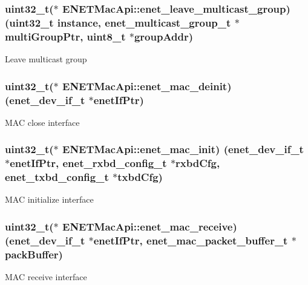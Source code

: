 \subsubsection[{\texorpdfstring{enet\+\_\+leave\+\_\+multicast\+\_\+group}{enet_leave_multicast_group}}]{\setlength{\rightskip}{0pt plus 5cm}uint32\+\_\+t($\ast$  E\+N\+E\+T\+Mac\+Api\+::enet\+\_\+leave\+\_\+multicast\+\_\+group) (uint32\+\_\+t instance, {\bf enet\+\_\+multicast\+\_\+group\+\_\+t} $\ast$multi\+Group\+Ptr, uint8\+\_\+t $\ast$group\+Addr)}\hypertarget{structENETMacApi_a3f14ecb5e7c1ba8244d6f6f7c6569d02}{}\label{structENETMacApi_a3f14ecb5e7c1ba8244d6f6f7c6569d02}
Leave multicast group 
\subsubsection[{\texorpdfstring{enet\+\_\+mac\+\_\+deinit}{enet_mac_deinit}}]{\setlength{\rightskip}{0pt plus 5cm}uint32\+\_\+t($\ast$  E\+N\+E\+T\+Mac\+Api\+::enet\+\_\+mac\+\_\+deinit) ({\bf enet\+\_\+dev\+\_\+if\+\_\+t} $\ast$enet\+If\+Ptr)}\hypertarget{structENETMacApi_a9c92145416f2d7d6fb5e24f8c4ba1494}{}\label{structENETMacApi_a9c92145416f2d7d6fb5e24f8c4ba1494}
M\+AC close interface 
\subsubsection[{\texorpdfstring{enet\+\_\+mac\+\_\+init}{enet_mac_init}}]{\setlength{\rightskip}{0pt plus 5cm}uint32\+\_\+t($\ast$  E\+N\+E\+T\+Mac\+Api\+::enet\+\_\+mac\+\_\+init) ({\bf enet\+\_\+dev\+\_\+if\+\_\+t} $\ast$enet\+If\+Ptr, {\bf enet\+\_\+rxbd\+\_\+config\+\_\+t} $\ast$rxbd\+Cfg, {\bf enet\+\_\+txbd\+\_\+config\+\_\+t} $\ast$txbd\+Cfg)}\hypertarget{structENETMacApi_a52c96a89ccf5d536663fa4fabad6b153}{}\label{structENETMacApi_a52c96a89ccf5d536663fa4fabad6b153}
M\+AC initialize interface 
\subsubsection[{\texorpdfstring{enet\+\_\+mac\+\_\+receive}{enet_mac_receive}}]{\setlength{\rightskip}{0pt plus 5cm}uint32\+\_\+t($\ast$  E\+N\+E\+T\+Mac\+Api\+::enet\+\_\+mac\+\_\+receive) ({\bf enet\+\_\+dev\+\_\+if\+\_\+t} $\ast$enet\+If\+Ptr, {\bf enet\+\_\+mac\+\_\+packet\+\_\+buffer\+\_\+t} $\ast$pack\+Buffer)}\hypertarget{structENETMacApi_a7714f2ddedc0b7939c6160ab1abaff5d}{}\label{structENETMacApi_a7714f2ddedc0b7939c6160ab1abaff5d}
M\+AC receive interface 
